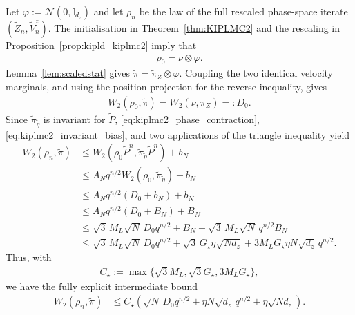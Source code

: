 Let $\varphi:=\mathcal N(0,\mathbb I_{d_z})$ and let $\rho_n$ be the law of the full rescaled phase-space iterate $(\widetilde Z_n,\widetilde V_n^z)$.  The initialisation in Theorem~\ref{thm:KIPLMC2} and the rescaling in Proposition~\ref{prop:kipld_kiplmc2} imply that
\begin{align*}
\rho_0=\nu\otimes\varphi.
\end{align*}
Lemma~\ref{lem:scaledstat} gives $\widetilde\pi=\widetilde\pi_Z\otimes\varphi$.  Coupling the two identical velocity marginals, and using the position projection for the reverse inequality, gives
\begin{align*}
W_2(\rho_0,\widetilde\pi)
=W_2(\nu,\widetilde\pi_Z)=:D_0.
\end{align*}
Since $\widetilde\pi_{\widetilde\eta}$ is invariant for $\widetilde P$, \eqref{eq:kiplmc2_phase_contraction}, \eqref{eq:kiplmc2_invariant_bias}, and two applications of the triangle inequality yield
\begin{align*}
W_2(\rho_n,\widetilde\pi)
&\leq W_2(\rho_0\widetilde P^n,
\widetilde\pi_{\widetilde\eta}\widetilde P^n)+b_N\\
&\leq A_Nq^{n/2}W_2(\rho_0,\widetilde\pi_{\widetilde\eta})+b_N\\
&\leq A_Nq^{n/2}(D_0+b_N)+b_N\\
&\leq A_Nq^{n/2}(D_0+B_N)+B_N\\
&\leq\sqrt3\,M_L\sqrt N\,D_0q^{n/2}+B_N+\sqrt3\,M_L\sqrt N\,q^{n/2}B_N\\
&\leq\sqrt3\,M_L\sqrt N\,D_0q^{n/2}
+\sqrt3\,G_\star\eta\sqrt{Nd_z}+3M_LG_\star\eta N\sqrt{d_z}\,q^{n/2}.
\end{align*}
Thus, with
\begin{align*}
C_\star:=\max\{\sqrt3M_L,\sqrt3G_\star,3M_LG_\star\},
\end{align*}
we have the fully explicit intermediate bound
\begin{align}
W_2(\rho_n,\widetilde\pi)
&\leq C_\star\left(\sqrt N\,D_0q^{n/2}+\eta N\sqrt{d_z}\,q^{n/2}+\eta\sqrt{Nd_z}\right).
\label{eq:kiplmc2_main_dependencies}
\end{align}


